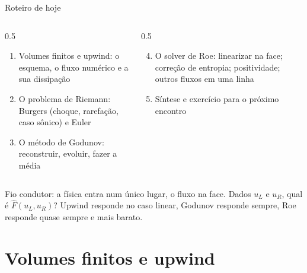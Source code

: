 \documentclass[aspectratio=169,10pt]{beamer}
\newcommand{\Fh}{\widehat F}
\begin{document}
\begin{frame}{Roteiro de hoje}
\begin{columns}[T]
\begin{column}{0.5\textwidth}
\begin{enumerate}
\item Volumes finitos e upwind: o esquema, o fluxo numérico e a sua dissipação
\item O problema de Riemann: Burgers (choque, rarefação, caso sônico) e Euler
\item O método de Godunov: reconstruir, evoluir, fazer a média
\end{enumerate}
\end{column}
\begin{column}{0.5\textwidth}
\begin{enumerate}\setcounter{enumi}{3}
\item O solver de Roe: linearizar na face; correção de entropia; positividade; outros fluxos em uma linha
\item Síntese e exercício para o próximo encontro
\end{enumerate}
\end{column}
\end{columns}
\vspace{0.3cm}
\begin{mensagem}
Fio condutor: a física entra num único lugar, o fluxo na face. Dados $u_L$ e $u_R$, qual é $\Fh(u_L,u_R)$? Upwind responde no caso linear, Godunov responde sempre, Roe responde quase sempre e mais barato.
\end{mensagem}
\end{frame}


\section{Volumes finitos e upwind}
\end{document}
